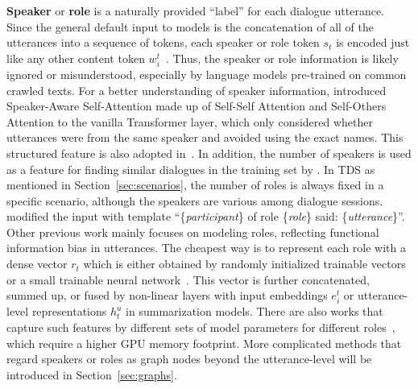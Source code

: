 \textbf{Speaker} or \textbf{role} is a naturally provided ``label'' for each dialogue utterance. 
Since the general default input to models is the concatenation of all of 
the utterances into a sequence of tokens, each speaker or role token $s_t$ 
is encoded just like any other content token $w_i^t$~\cite{chen2020multi,feng2021language}. Thus, the speaker or role 
information is likely ignored or misunderstood, especially by language models pre-trained 
on common crawled texts. 
For a better understanding of speaker information, \citet{lei2021hierarchical} introduced Speaker-Aware Self-Attention made up of Self-Self Attention and Self-Others Attention to the vanilla Transformer layer, which only considered whether utterances were from the same speaker and avoided using the exact names. This structured feature is also 
adopted in~\cite{lei2021finer}.
In addition, the number of speakers is used as a feature for 
finding similar dialogues in the training set by \citet{prodan2021prompt}.
In TDS as mentioned in Section~\ref{sec:scenarios}, the number of roles is always fixed in a specific scenario, although the speakers are various among dialogue sessions.
\cite{yang2022tanet} modified the input with template ``\{\textit{participant}\} of role \{\textit{role}\} said: \{\textit{utterance}\}''.
Other previous work mainly focuses on modeling roles, reflecting functional information bias in utterances. 
The cheapest way is to represent each role with a dense vector $r_t$ which is either obtained by randomly initialized trainable vectors~\cite{zhu2020end,duan2019legal,qi2021improving,gan2021inspectional,asi2022end} or a small trainable neural network~\cite{song2020summarizing}. This vector is further concatenated, summed up, or fused by non-linear layers with input embeddings $e_i^t$ or utterance-level representations $h_t^u$ in summarization models. 
There are also works that capture such features by different sets of model parameters for different roles~\cite{zou2021topic,zhang2020unsupervised,yuan2019scaffolds}, which require a higher GPU memory footprint. More complicated methods that regard speakers or roles as graph nodes beyond the utterance-level will be introduced in Section~\ref{sec:graphs}.


